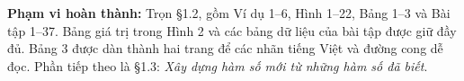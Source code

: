 \documentclass[12pt,a4paper]{article}
\begin{document}
\noindent\textbf{Phạm vi hoàn thành:} Trọn §1.2, gồm Ví dụ 1–6, Hình 1–22, Bảng 1–3 và Bài tập 1–37. Bảng giá trị trong Hình 2 và các bảng dữ liệu của bài tập được giữ đầy đủ. Bảng 3 được dàn thành hai trang để các nhãn tiếng Việt và đường cong dễ đọc. Phần tiếp theo là §1.3: \textit{Xây dựng hàm số mới từ những hàm số đã biết}.
\end{document}
